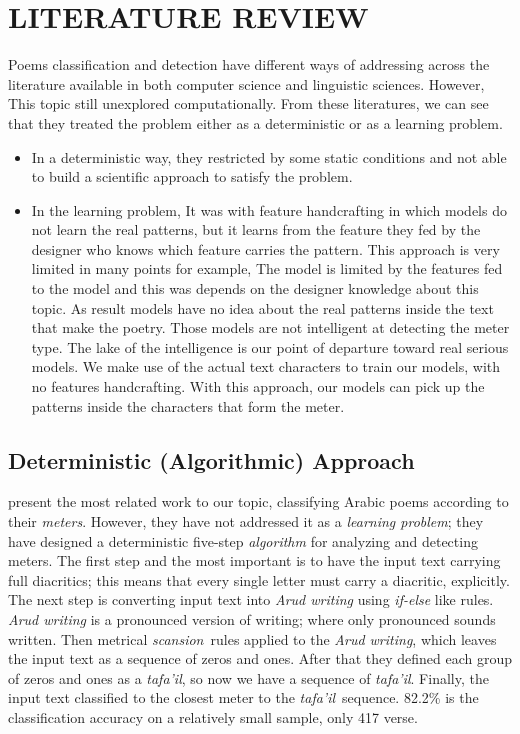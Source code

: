 \chapter{\uppercase{LITERATURE REVIEW}}\label{ch_literature}

Poems classification and detection have different ways of addressing across the literature available in both computer science and linguistic sciences. However, This topic still unexplored computationally.
From these literatures, we can see that they treated the problem either as a deterministic or as a learning problem.

\begin{itemize}
  \item In a deterministic way, they restricted by some static conditions and not able to build a scientific approach to satisfy the problem.

\item In the learning problem, It was with feature handcrafting in which models do not learn the real patterns, but it learns from the feature they fed by the designer who knows which feature carries the pattern. This approach is very limited in many points for example, The model is limited by the features fed to the model and this was depends on the designer knowledge about this topic. As result models have no idea about the real patterns inside the text that make the poetry. Those models are not intelligent at detecting the meter type. The lake of the intelligence is our point of departure toward real serious models. We make use of the actual text characters to train our models, with no features handcrafting. With this approach, our models can pick up the patterns inside the characters that form the meter.

\end{itemize}
  
\newpage
\section{Deterministic (Algorithmic) Approach}\label{sec:determ-algor-appr}

\cite{Abuata2016RuleBasedAlgorithmFor} present the most related work to our topic, classifying Arabic poems according to their \textit{meters}. However, they have not addressed it as a \textit{learning problem}; they have designed a deterministic five-step \textit{algorithm} for analyzing and detecting meters. The first step and the most important is to have the input text carrying full diacritics; this means that every single letter must carry a diacritic, explicitly. The next step is converting input text into \textit{Arud writing} using \textit{if-else} like rules. \textit{Arud writing} is a pronounced version of writing; where only pronounced sounds written. Then metrical \textit{scansion} rules applied to the \textit{Arud writing}, which leaves the input text as a sequence of zeros and ones. After that they defined each group of zeros and ones as a \textit{tafa'il}, so now we have a sequence of \textit{tafa'il}. Finally, the input text classified to the closest meter to the \textit{tafa'il} sequence. 82.2\% is the classification accuracy on a relatively small sample, only 417 verse.

